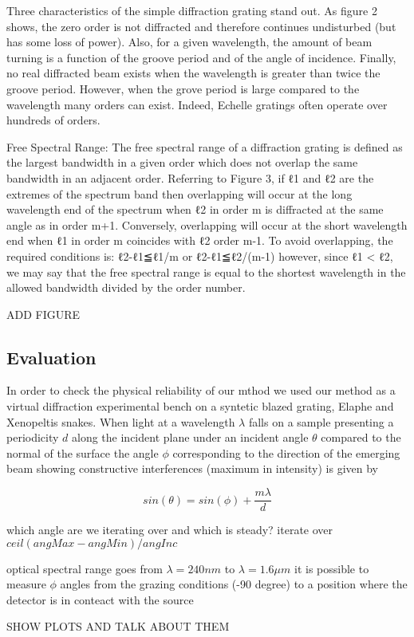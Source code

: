 Three characteristics of the simple diffraction grating stand out. As figure 2 shows, the zero order is not diffracted and therefore continues undisturbed (but has some loss of power). Also, for a given wavelength, the amount of beam turning is a function of the groove period and of the angle of incidence. Finally, no real diffracted beam exists when the wavelength is greater than twice the groove period. However, when the grove period is large compared to the wavelength many orders can exist. Indeed, Echelle gratings often operate over hundreds of orders.

Free Spectral Range:
The free spectral range of a diffraction grating is defined as the largest bandwidth in a given order which does not overlap the same bandwidth in an adjacent order. Referring to Figure 3, if ℓ1 and ℓ2 are the extremes of the spectrum band then overlapping will occur at the long wavelength end of the spectrum when ℓ2 in order m is diffracted at the same angle as in order m+1. Conversely, overlapping will occur at the short wavelength end when ℓ1 in order m coincides with ℓ2 order m-1. To avoid overlapping, the required conditions is:
ℓ2-ℓ1≦ℓ1/m or ℓ2-ℓ1≦ℓ2/(m-1)
however, since ℓ1 < ℓ2, we may say that the free spectral range is equal to the shortest wavelength in the allowed bandwidth divided by the order number.

ADD FIGURE


\subsection{Evaluation}
In order to check the physical reliability of our mthod we used our method as a virtual diffraction experimental bench on a syntetic blazed grating, Elaphe and Xenopeltis snakes.
When light at a wavelength $\lambda$ falls on a sample presenting a periodicity $d$ along the incident plane under an incident angle $\theta$ compared to the normal of the surface the angle $\phi$ corresponding to the direction of the emerging beam showing constructive interferences (maximum in intensity) is given by

\begin{equation}
  sin(\theta) = sin(\phi) + \frac{m \lambda}{d}
\end{equation}

which angle are we iterating over and which is steady?
iterate over $ceil(angMax - angMin) / angInc$

optical spectral range goes from $\lambda=240 nm$ to $\lambda=1.6 \mu m$
it is possible to measure $\phi$ angles from the grazing conditions (-90 degree) to a position where the detector is in conteact with the source


SHOW PLOTS AND TALK ABOUT THEM

